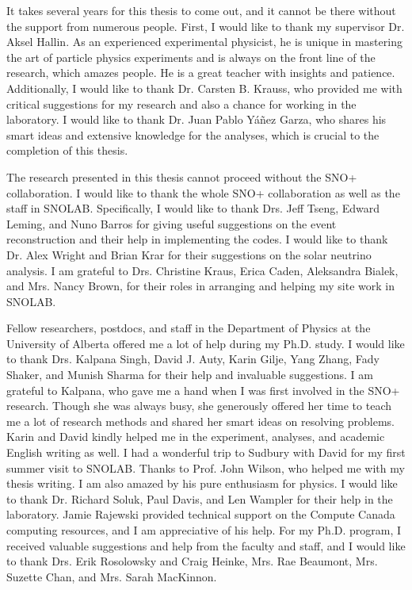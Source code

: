 It takes several years for this thesis to come out, and it cannot be there without the support from numerous people. First, I would like to thank my supervisor Dr. Aksel Hallin. As an experienced experimental physicist, he is unique in mastering the art of particle physics experiments and is always on the front line of the research, which amazes people. He is a great teacher with insights and patience. Additionally, I would like to thank Dr. Carsten B. Krauss, who provided me with critical suggestions for my research and also a chance for working in the laboratory. I would like to thank Dr. Juan Pablo Y\'{a}\~{n}ez Garza, who shares his smart ideas and extensive knowledge for the analyses, which is crucial to the completion of this thesis.

The research presented in this thesis cannot proceed without the SNO+ collaboration. I would like to thank the whole SNO+ collaboration as well as the staff in SNOLAB. Specifically, I would like to thank Drs. Jeff Tseng, Edward Leming, and Nuno Barros for giving useful suggestions on the event reconstruction and their help in implementing the codes. I would like to thank Dr. Alex Wright and Brian Krar for their suggestions on the solar neutrino analysis. I am grateful to Drs. Christine Kraus, Erica Caden, Aleksandra Bialek, and Mrs. Nancy Brown, for their roles in arranging and helping my site work in SNOLAB.

Fellow researchers, postdocs, and staff in the Department of Physics at the University of Alberta offered me a lot of help during my Ph.D. study. I would like to thank Drs. Kalpana Singh, David J. Auty, Karin Gilje, Yang Zhang, Fady Shaker, and Munish Sharma for their help and invaluable suggestions. I am grateful to Kalpana, who gave me a hand when I was first involved in the SNO+ research. Though she was always busy, she generously offered her time to teach me a lot of research methods and shared her smart ideas on resolving problems. Karin and David kindly helped me in the experiment, analyses, and academic English writing as well. I had a wonderful trip to Sudbury with David for my first summer visit to SNOLAB. Thanks to Prof. John Wilson, who helped me with my thesis writing. I am also amazed by his pure enthusiasm for physics. I would like to thank Dr. Richard Soluk, Paul Davis, and Len Wampler for their help in the laboratory. Jamie Rajewski provided technical support on the Compute Canada computing resources, and I am appreciative of his help. For my Ph.D. program, I received valuable suggestions and help from the faculty and staff, and I would like to thank Drs. Erik Rosolowsky and Craig Heinke, Mrs. Rae Beaumont, Mrs. Suzette Chan, and Mrs. Sarah MacKinnon.

